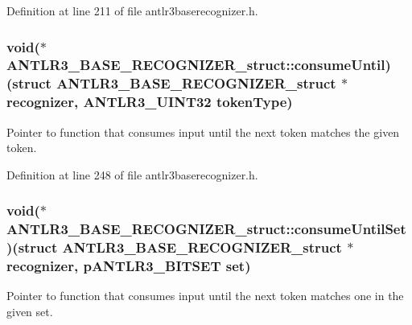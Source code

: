 Definition at line 211 of file antlr3baserecognizer.\-h.

\hypertarget{struct_a_n_t_l_r3___b_a_s_e___r_e_c_o_g_n_i_z_e_r__struct_ac0f5cbb6c09663060d050c048b099bb2}{
\subsubsection[{consume\-Until}]{\setlength{\rightskip}{0pt plus 5cm}void($\ast$ A\-N\-T\-L\-R3\-\_\-\-B\-A\-S\-E\-\_\-\-R\-E\-C\-O\-G\-N\-I\-Z\-E\-R\-\_\-struct\-::consume\-Until)(struct {\bf A\-N\-T\-L\-R3\-\_\-\-B\-A\-S\-E\-\_\-\-R\-E\-C\-O\-G\-N\-I\-Z\-E\-R\-\_\-struct} $\ast${\bf recognizer}, {\bf A\-N\-T\-L\-R3\-\_\-\-U\-I\-N\-T32} token\-Type)}}\label{struct_a_n_t_l_r3___b_a_s_e___r_e_c_o_g_n_i_z_e_r__struct_ac0f5cbb6c09663060d050c048b099bb2}
Pointer to function that consumes input until the next token matches the given token. 

Definition at line 248 of file antlr3baserecognizer.\-h.

\hypertarget{struct_a_n_t_l_r3___b_a_s_e___r_e_c_o_g_n_i_z_e_r__struct_a899028e4df9d395c95f8ceb45ecbe58e}{
\subsubsection[{consume\-Until\-Set}]{\setlength{\rightskip}{0pt plus 5cm}void($\ast$ A\-N\-T\-L\-R3\-\_\-\-B\-A\-S\-E\-\_\-\-R\-E\-C\-O\-G\-N\-I\-Z\-E\-R\-\_\-struct\-::consume\-Until\-Set)(struct {\bf A\-N\-T\-L\-R3\-\_\-\-B\-A\-S\-E\-\_\-\-R\-E\-C\-O\-G\-N\-I\-Z\-E\-R\-\_\-struct} $\ast${\bf recognizer}, {\bf p\-A\-N\-T\-L\-R3\-\_\-\-B\-I\-T\-S\-E\-T} {\bf set})}}\label{struct_a_n_t_l_r3___b_a_s_e___r_e_c_o_g_n_i_z_e_r__struct_a899028e4df9d395c95f8ceb45ecbe58e}
Pointer to function that consumes input until the next token matches one in the given set. 

